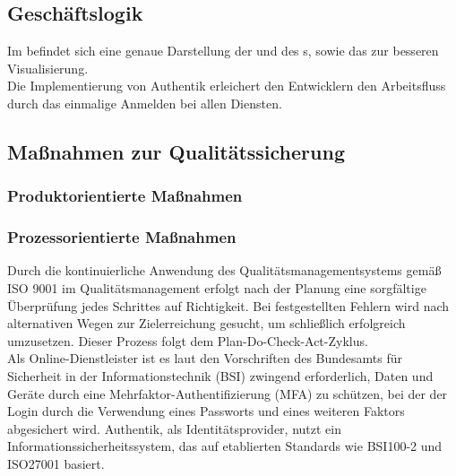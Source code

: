 \subsection{Geschäftslogik}
\label{sec:Geschaeftslogik}
Im  befindet sich eine genaue Darstellung der  und des s, 
sowie das  zur besseren Visualisierung. 
\\Die Implementierung von Authentik erleichert den Entwicklern den Arbeitsfluss durch das einmalige Anmelden bei allen Diensten.

\subsection{Maßnahmen zur Qualitätssicherung}
\label{sec:Qualitaetssicherung}

\subsubsection{Produktorientierte Maßnahmen}
\label{sec:ProduktorientierteMaßnahmen}

\subsubsection{Prozessorientierte Maßnahmen}
\label{sec:ProzessorientierteMaßnahmen}
Durch die kontinuierliche Anwendung des Qualitätsmanagementsystems gemäß ISO 9001 im Qualitätsmanagement erfolgt nach der Planung 
eine sorgfältige Überprüfung jedes Schrittes auf Richtigkeit. Bei festgestellten Fehlern wird nach alternativen Wegen zur 
Zielerreichung gesucht, um schließlich erfolgreich umzusetzen. Dieser Prozess folgt dem Plan-Do-Check-Act-Zyklus.
\\Als Online-Dienstleister ist es laut den Vorschriften des Bundesamts für Sicherheit in der Informationstechnik (BSI) 
zwingend erforderlich, Daten und Geräte durch eine Mehrfaktor-Authentifizierung (\acs*{MFA}) zu schützen, bei der der Login durch 
die Verwendung eines Passworts und eines weiteren Faktors abgesichert wird. Authentik, als Identitätsprovider, nutzt ein 
Informationssicherheitssystem, das auf etablierten Standards wie BSI100-2 und ISO27001 basiert.